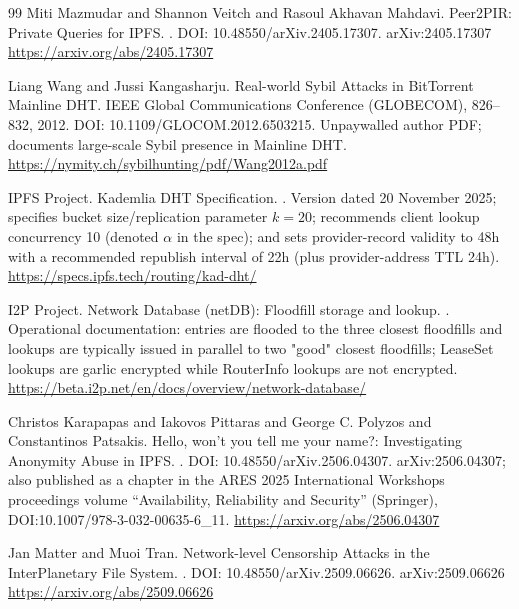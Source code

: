 \documentclass[11pt]{article}
\begin{document}
\begin{thebibliography}{99}
Miti Mazmudar and Shannon Veitch and Rasoul Akhavan Mahdavi.
\newblock Peer2PIR: Private Queries for {IPFS}.
.
\newblock DOI: 10.48550/arXiv.2405.17307.
\newblock arXiv:2405.17307
\newblock \url{https://arxiv.org/abs/2405.17307}

Liang Wang and Jussi Kangasharju.
\newblock Real-world Sybil Attacks in {BitTorrent} Mainline {DHT}.
 {IEEE} Global Communications Conference (GLOBECOM), 826--832, 2012.
\newblock DOI: 10.1109/GLOCOM.2012.6503215.
\newblock Unpaywalled author PDF; documents large-scale Sybil presence in Mainline DHT.
\newblock \url{https://nymity.ch/sybilhunting/pdf/Wang2012a.pdf}

{IPFS Project}.
 {K}ademlia {DHT} Specification.
.
\newblock Version dated 20 November 2025; specifies bucket size/replication parameter $k=20$; recommends client lookup concurrency 10 (denoted $\alpha$ in the spec); and sets provider-record validity to 48h with a recommended republish interval of 22h (plus provider-address TTL 24h).
\newblock \url{https://specs.ipfs.tech/routing/kad-dht/}

{I2P Project}.
\newblock Network Database (netDB): Floodfill storage and lookup.
.
\newblock Operational documentation: entries are flooded to the three closest floodfills and lookups are typically issued in parallel to two "good" closest floodfills; LeaseSet lookups are garlic encrypted while RouterInfo lookups are not encrypted.
\newblock \url{https://beta.i2p.net/en/docs/overview/network-database/}

Christos Karapapas and Iakovos Pittaras and George C. Polyzos and Constantinos Patsakis.
\newblock Hello, won't you tell me your name?: Investigating Anonymity Abuse in {IPFS}.
.
\newblock DOI: 10.48550/arXiv.2506.04307.
\newblock arXiv:2506.04307; also published as a chapter in the ARES 2025 International Workshops proceedings volume ``Availability, Reliability and Security'' (Springer), DOI:10.1007/978-3-032-00635-6\_11.
\newblock \url{https://arxiv.org/abs/2506.04307}

Jan Matter and Muoi Tran.
\newblock Network-level Censorship Attacks in the {I}nter{P}lanetary {F}ile {S}ystem.
.
\newblock DOI: 10.48550/arXiv.2509.06626.
\newblock arXiv:2509.06626
\newblock \url{https://arxiv.org/abs/2509.06626}



\end{thebibliography}
\end{document}
